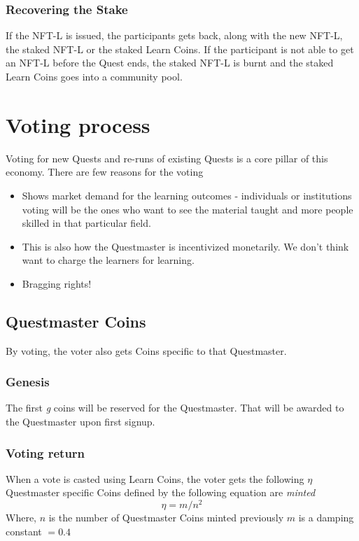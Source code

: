 \documentclass{article}
\begin{document}
        \subsubsection{Recovering the Stake}
          If the NFT-L is issued, the participants gets back, along with the new NFT-L, the staked NFT-L or the staked Learn Coins.
          \break
          If the participant is not able to get an NFT-L before the Quest ends, the staked NFT-L is burnt and the staked Learn Coins goes into a community pool.
  \section{Voting process}
    Voting for new Quests and re-runs of existing Quests is a core pillar of this economy. 
    There are few reasons for the voting
    \begin{itemize}
      \item Shows market demand for the learning outcomes - individuals or institutions voting will be the ones who want to see the material taught and more people skilled in that particular field.
      \item This is also how the Questmaster is incentivized monetarily. We don't think want to charge the learners for learning.
      \item Bragging rights!
    \end{itemize}
    \subsection{Questmaster Coins}
      By voting, the voter also gets Coins specific to that Questmaster.
      \subsubsection{Genesis}
        The first \textit{g} coins will be reserved for the Questmaster. That will be awarded to the Questmaster upon first signup.
      \subsubsection{Voting return}
        When a vote is casted using Learn Coins, the voter gets the following \(\eta\) Questmaster specific Coins defined by the following equation are \textit{minted}
        \[
          \eta = m/n^{2}
        \]        
        Where,
        \break
        \(n\) is the number of Questmaster Coins minted previously
        \(m\) is a damping constant \(=0.4\)
\end{document}
